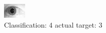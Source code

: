 \begin{figure}[h!]
\begin{center}
\includegraphics[width=0.60\columnwidth]{figures/ID1829_class_4_target_3.png}
\end{center}
\caption{ Classification: 4 actual target: 3}
\label{fig:ID1829_class_4_target_3}
\end{figure}
